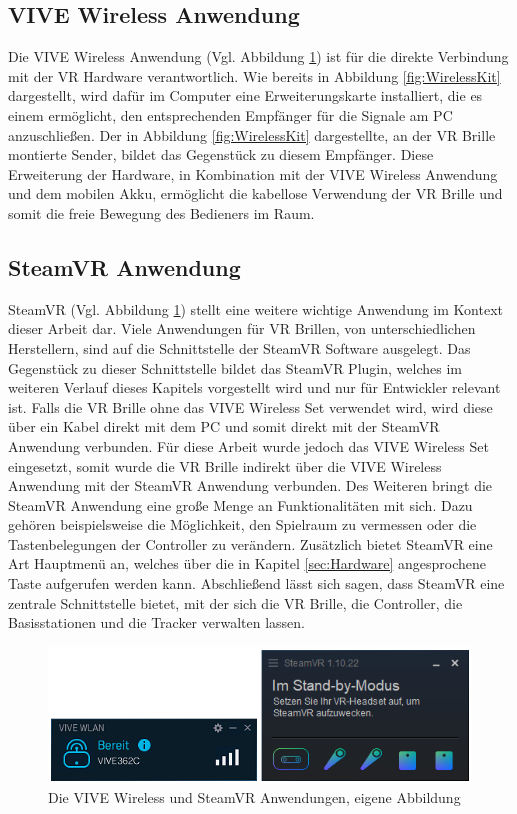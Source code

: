 \subsection{VIVE Wireless Anwendung}\label{sec:VIVEWireless}
Die VIVE Wireless Anwendung (Vgl. Abbildung \ref{fig:VIVEWirelessSteamVR}) ist für die direkte Verbindung mit der VR Hardware verantwortlich. Wie bereits in Abbildung \ref{fig:WirelessKit} dargestellt, wird dafür im Computer eine Erweiterungskarte installiert, die es einem ermöglicht, den entsprechenden Empfänger für die Signale am PC anzuschließen. Der in Abbildung \ref{fig:WirelessKit} dargestellte, an der VR Brille montierte Sender, bildet das Gegenstück zu diesem Empfänger. Diese Erweiterung der Hardware, in Kombination mit der VIVE Wireless Anwendung und dem mobilen Akku, ermöglicht die kabellose Verwendung der VR Brille und somit die freie Bewegung des Bedieners im Raum.

\subsection{SteamVR Anwendung}\label{sec:SteamVR}
SteamVR (Vgl. Abbildung \ref{fig:VIVEWirelessSteamVR}) stellt eine weitere wichtige Anwendung im Kontext dieser Arbeit dar. Viele Anwendungen für VR Brillen, von unterschiedlichen Herstellern, sind auf die Schnittstelle der SteamVR Software ausgelegt. Das Gegenstück zu dieser Schnittstelle bildet das SteamVR Plugin, welches im weiteren Verlauf dieses Kapitels vorgestellt wird und nur für Entwickler relevant ist. Falls die VR Brille ohne das VIVE Wireless Set verwendet wird, wird diese über ein Kabel direkt mit dem PC und somit direkt mit der SteamVR Anwendung verbunden. Für diese Arbeit wurde jedoch das VIVE Wireless Set eingesetzt, somit wurde die VR Brille indirekt über die VIVE Wireless Anwendung mit der SteamVR Anwendung verbunden. Des Weiteren bringt die SteamVR Anwendung eine große Menge an Funktionalitäten mit sich. Dazu gehören beispielsweise die Möglichkeit, den Spielraum zu vermessen oder die Tastenbelegungen der Controller zu verändern. Zusätzlich bietet SteamVR eine Art Hauptmenü an, welches über die in Kapitel \ref{sec:Hardware} angesprochene Taste aufgerufen werden kann. Abschließend lässt sich sagen, dass SteamVR eine zentrale Schnittstelle bietet, mit der sich die VR Brille, die Controller, die Basisstationen und die Tracker verwalten lassen.
\begin{figure}[h]
	\centering
	\includegraphics[width=0.8\linewidth]{Bilder/A33_VIVESteam}
	\caption{Die VIVE Wireless und SteamVR Anwendungen, eigene Abbildung}
	\label{fig:VIVEWirelessSteamVR}
\end{figure}

